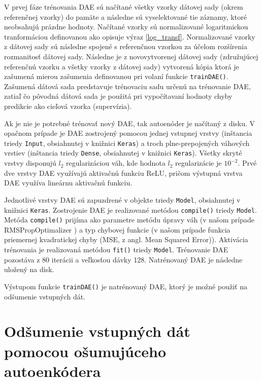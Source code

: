 V prvej fáze trénovania DAE sú načítané všetky vzorky dátovej sady (okrem referenčnej vzorky) do pamäte a následne sú vyselektované tie záznamy, ktoré neobsahujú prázdne hodnoty. Načítané vzorky sú normalizované logaritmickou tranformáciou definovanou ako opisuje výraz \ref{log_transf}. Normalizované vzorky z dátovej sady sú následne spojené s referenčnou vzorkou za účelom rozšírenia rozmanitosť dátovej sady.  Následne je z novovytvorenej dátovej sady (združujúcej referenčnú vzorku a všetky vzorky z dátovej sady) vytvorená kópia ktorá je zašumená mierou zašumenia definovanou pri volaní funkcie \texttt{trainDAE()}. Zašumená dátová sada predstavuje trénovaciu sadu určenú na trénovanie DAE, zatiaľ čo pôvodná dátová sada je použitá pri vypočítavaní hodnoty chyby predikcie ako cieľová vzorka (supervízia).

Ak je nie je potrebné trénovať nový DAE, tak autoenóder je načítaný z disku. V opačnom prípade je DAE zostrojený pomocou jednej vstupnej vrstvy (inštancia triedy \texttt{Input}, obsiahnutej v knižnici \texttt{Keras}) a troch plne-prepojených váhových vrstiev (inštancia triedy \texttt{Dense}, obsiahnutej v knižnici \texttt{Keras}). Všetky skryté vrstvy disponujú $l_2$ regularizáciou váh, kde hodnota $l_2$ regularizácie je $10^{-2}$. Prvé dve vrstvy DAE využívajú aktivačnú funkciu ReLU, pričom výstupná vrstva DAE využíva lineárnu aktivačnú funkciu.

Jednotlivé vrstvy DAE sú zapuzdrené v objekte triedy \texttt{Model}, obsiahnutej v knižnici \texttt{Keras}. Zostrojenie DAE je realizované metódou \texttt{compile()} triedy \texttt{Model}. Metóda \texttt{compile()} prijíma ako parametre metódu úpravy váh (v našom prípade RMSPropOptimalizer \cite{Goh1995}) a typ chybovej funkcie (v našom prípade funkcia priemernej kvadratickej chyby (MSE, z angl. Mean Squared Error)). Aktivácia trénovania je realizovaná metódou \texttt{fit()} triedy \texttt{Model}. Trénovanie DAE pozostáva z 80 iterácii a veľkosťou dávky 128. Natrénovaný DAE je následne uložený na disk.

Výstupom funkcie \texttt{trainDAE()} je natrénovaný DAE, ktorý je možné použiť na odšumenie vstupných dát.

\section{Odšumenie vstupných dát pomocou ošumujúceho autoenkódera}
\label{predict_DAE}

